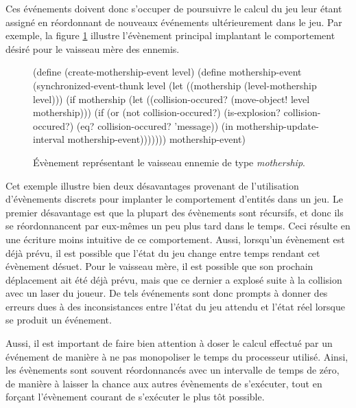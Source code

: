 \documentclass[12pt,oneside,letterpaper,francais]{book}
\begin{document}
Ces événements doivent donc s'occuper de poursuivre le calcul du jeu
leur étant assigné en réordonnant de nouveaux événements
ultérieurement dans le jeu. Par exemple, la figure \ref{Exp:mother-ev}
illustre l'évènement principal implantant le comportement désiré pour
le vaisseau mère des ennemis.

\begin{figure}[htb!]
  \begin{schemecode}
(define (create-mothership-event level)
 (define mothership-event
   (synchronized-event-thunk level
     (let ((mothership (level-mothership level)))
       (if mothership
           (let ((collision-occured? (move-object! level mothership)))
             (if (or (not collision-occured?)
                     (is-explosion? collision-occured?)
                     (eq? collision-occured? 'message))
                 (in mothership-update-interval mothership-event)))))))
  mothership-event)
  \end{schemecode}
  \caption{Évènement représentant le vaisseau ennemie de type
    \textit{mothership}.}
  \label{Exp:mother-ev}
\end{figure}

Cet exemple illustre bien deux désavantages provenant de l'utilisation
d'évènements discrets pour implanter le comportement d'entités dans un
jeu. Le premier désavantage est que la plupart des évènements sont
récursifs, et donc ils se réordonnancent par eux-mêmes un peu plus
tard dans le temps. Ceci résulte en une écriture moins intuitive de ce
comportement. Aussi, lorsqu'un évènement est déjà prévu, il est
possible que l'état du jeu change entre temps rendant cet évènement
désuet. Pour le vaisseau mère, il est possible que son prochain
déplacement ait été déjà prévu, mais que ce dernier a explosé suite à
la collision avec un laser du joueur. De tels événements sont donc
prompts à donner des erreurs dues à des inconsistances entre l'état du
jeu attendu et l'état réel lorsque se produit un événement.

Aussi, il est important de faire bien attention à doser le calcul
effectué par un événement de manière à ne pas monopoliser le temps du
processeur utilisé. Ainsi, les évènements sont souvent réordonnancés
avec un intervalle de temps de zéro, de manière à laisser la chance
aux autres évènements de s'exécuter, tout en forçant l'évènement
courant de s'exécuter le plus tôt possible.
\end{document}
